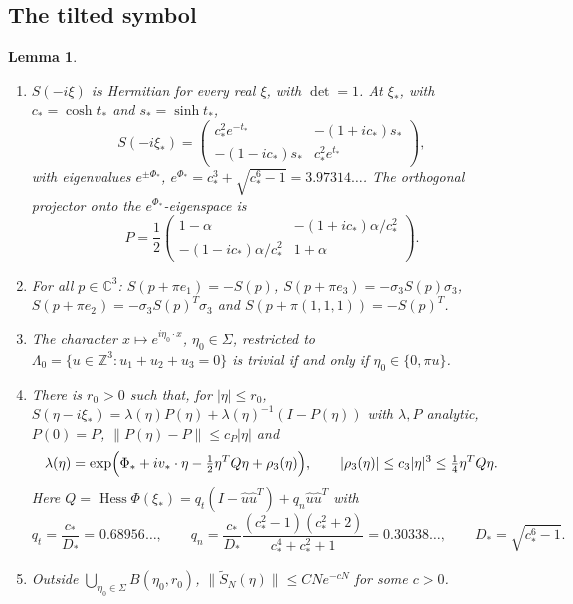 \documentclass[11pt]{amsart}
\newtheorem{lemma}[theorem]{Lemma}
\theoremstyle{definition}
\theoremstyle{remark}
\newcommand{\Z}{\mathbb{Z}}
\newcommand{\C}{\mathbb{C}}
\newcommand{\Hess}{\operatorname{Hess}}
\newcommand{\uhat}{\hat u}
\begin{document}
\subsection{The tilted symbol}\label{ssec:tilted}
\begin{lemma}\label{lem:symbol}
\begin{enumerate}[label=(\alph*)]
\item $S(-i\xi)$ is Hermitian for every real $\xi$, with $\det=1$.  At
  $\xi_*$, with $c_*=\cosh t_*$ and $s_*=\sinh t_*$,
  \[
  S(-i\xi_*)=\begin{pmatrix}c_*^2e^{-t_*}&-(1+ic_*)s_*\\-(1-ic_*)s_*&c_*^2e^{t_*}\end{pmatrix},
  \]
  with eigenvalues $e^{\pm\Phi_*}$, $e^{\Phi_*}=c_*^3+\sqrt{c_*^6-1}=3.97314\ldots$.
  The orthogonal projector onto the $e^{\Phi_*}$-eigenspace is
  \[
  P=\frac12\begin{pmatrix}1-\alpha&-(1+ic_*)\alpha/c_*^2\\-(1-ic_*)\alpha/c_*^2&1+\alpha\end{pmatrix}.
  \]
\item For all $p\in\C^3$: $S(p+\pi e_1)=-S(p)$, $S(p+\pi e_3)=-\sigma_3S(p)\sigma_3$,
  $S(p+\pi e_2)=-\sigma_3S(p)^T\sigma_3$ and $S(p+\pi(1,1,1))=-S(p)^T$.
\item The character $x\mapsto e^{i\eta_0\cdot x}$, $\eta_0\in\Sigma$,
  restricted to $\Lambda_0=\{u\in\Z^3:u_1+u_2+u_3=0\}$ is trivial if and only if
  $\eta_0\in\{0,\pi u\}$.
\item There is $r_0>0$ such that, for $|\eta|\le r_0$,
  $S(\eta-i\xi_*)=\lambda(\eta)P(\eta)+\lambda(\eta)^{-1}(I-P(\eta))$ with
  $\lambda,P$ analytic, $P(0)=P$, $\|P(\eta)-P\|\le c_P|\eta|$ and
  \[
  \lambda(\eta)=\exp\Bigl(\Phi_*+iv_*\cdot\eta-\tfrac12\eta^TQ\eta+\rho_3(\eta)\Bigr),\qquad
  |\rho_3(\eta)|\le c_3|\eta|^3\le\tfrac14\eta^TQ\eta .
  \]
  Here $Q=\Hess\Phi(\xi_*)=q_t(I-\uhat\uhat^T)+q_n\uhat\uhat^T$ with
  \[
  q_t=\frac{c_*}{D_*}=0.68956\ldots,\qquad
  q_n=\frac{c_*}{D_*}\frac{(c_*^2-1)(c_*^2+2)}{c_*^4+c_*^2+1}=0.30338\ldots,\qquad D_*=\sqrt{c_*^6-1}.
  \]
\item Outside $\bigcup_{\eta_0\in\Sigma}B(\eta_0,r_0)$,
  $\|\widetilde S_N(\eta)\|\le CNe^{-cN}$ for some $c>0$.
\end{enumerate}
\end{lemma}
\end{document}
